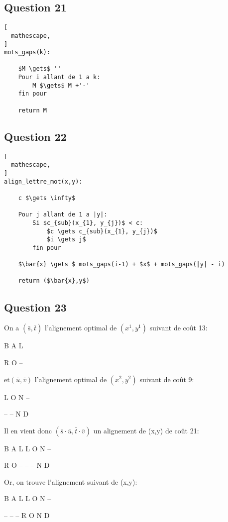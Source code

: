 \documentclass{report}
\begin{document}
\subsection*{Question 21}
\begin{lstlisting}[
  mathescape,
]
mots_gaps(k):

    $M \gets$ ''
    Pour i allant de 1 a k:
        M $\gets$ M +'-'
    fin pour

    return M
\end{lstlisting}

\subsection*{Question 22}
\begin{lstlisting}[
  mathescape,
]
align_lettre_mot(x,y):

    c $\gets \infty$
    
    Pour j allant de 1 a |y|:
        Si $c_{sub}(x_{1}, y_{j})$ < c:
            $c \gets c_{sub}(x_{1}, y_{j})$
            $i \gets j$
        fin pour
        
    $\bar{x} \gets $ mots_gaps(i-1) + $x$ + mots_gaps(|y| - i)
    
    return ($\bar{x},y$)

\end{lstlisting}

\subsection*{Question 23}
On a $(\bar{s},\bar{t})$ l'alignement optimal de $(x^{1},y^{1})$ suivant  de coût 13:
\begin{center}
B A L
 
R O --
\end{center}

et$(\bar{u},\bar{v})$ l'alignement optimal de $(x^{2},y^{2})$ suivant  de coût 9:
\begin{center}
L O N --
 
-- -- N D
\end{center}

Il en vient donc $(\bar{s}\cdot\bar{u},\bar{t}\cdot\bar{v})$ un alignement de (x,y) de coût 21:
\begin{center}
B A L L O N --
 
R O -- -- -- N D
\end{center}

Or, on trouve l'alignement suivant de (x,y):
\begin{center}
B A L L O N --

-- -- -- R O N D
\end{center}
\end{document}
